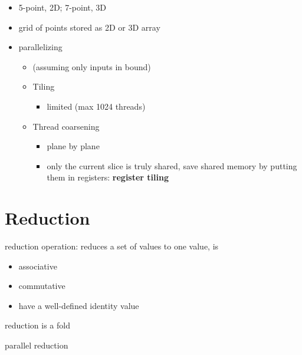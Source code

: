\documentclass{article}
\begin{document}
\begin{itemize}
\item 5-point, 2D; 7-point, 3D
\item grid of points stored as 2D or 3D array
\item parallelizing
\begin{itemize}
\item (assuming only inputs in bound)
\item Tiling
\begin{itemize}
\item limited (max 1024 threads)
\end{itemize}
\item Thread coarsening
\begin{itemize}
\item plane by plane
\item only the current slice is truly shared, save shared memory by putting them in registers: \textbf{register tiling}



\end{itemize}
\end{itemize}
\end{itemize}

\section{Reduction}


reduction operation: reduces a set of values to one value, is

\begin{itemize}
\item associative
\item commutative
\item have a well-defined identity value

\end{itemize}
reduction is a fold


parallel reduction
\end{document}

